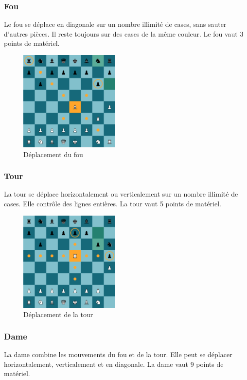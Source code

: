 \documentclass{article}
\begin{document}
\subsubsection*{Fou}
Le fou se déplace en diagonale sur un nombre illimité de cases, sans sauter d'autres pièces. Il reste toujours sur des cases de la même couleur.
Le fou vaut 3 points de matériel.

\begin{figure}[h]
    \centering
    \includegraphics[width=\textwidth,height=5.0cm,keepaspectratio]{fouMove.png}
    \caption{Déplacement du fou}
\end{figure}

\subsubsection*{Tour}
La tour se déplace horizontalement ou verticalement sur un nombre illimité de cases. Elle contrôle des lignes entières. La tour vaut 5 points de
matériel.

\begin{figure}[h]
    \centering
    \includegraphics[width=\textwidth,height=5.0cm,keepaspectratio]{tourMove.png}
    \caption{Déplacement de la tour}
\end{figure}

\subsubsection*{Dame}
La dame combine les mouvements du fou et de la tour. Elle peut se déplacer horizontalement, verticalement et en diagonale. La dame vaut 9 points 
de matériel.
\end{document}
